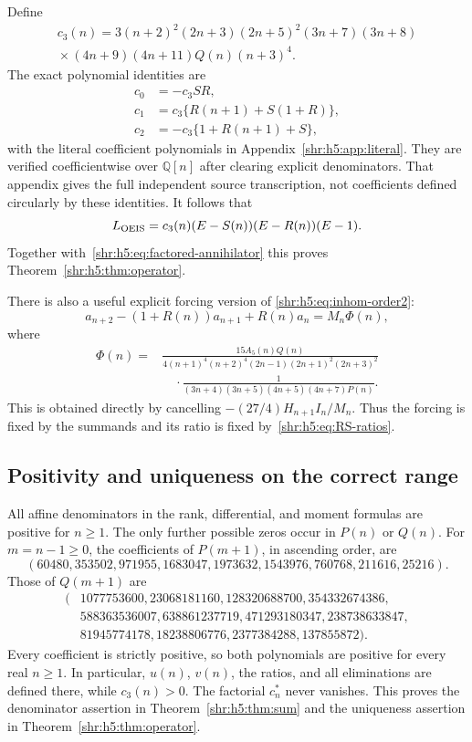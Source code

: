 \documentclass[11pt,letterpaper]{article}
\numberwithin{equation}{section}
\theoremstyle{definition}
\newcommand{\Q}{\mathbb Q}
\newcommand{\1}{\mathbf 1}
\begin{document}
Define
\begin{multline}
 c_3(n)=3(n+2)^2(2n+3)(2n+5)^2(3n+7)(3n+8)\\
 {}\times(4n+9)(4n+11)Q(n)(n+3)^4.
 \label{shr:h5:eq:c3}
\end{multline}
The exact polynomial identities are
\begin{align}
 c_0&=-c_3SR,\\
 c_1&=c_3\{R(n+1)+S(1+R)\},\\
 c_2&=-c_3\{1+R(n+1)+S\},
 \label{shr:h5:eq:literal-identities}
\end{align}
with the literal coefficient polynomials in Appendix~\ref{shr:h5:app:literal}.
They are verified coefficientwise over $\Q[n]$ after clearing
explicit denominators. That appendix gives the full independent source
transcription, not coefficients defined circularly by these identities.
It follows that
\begin{equation}
 L_{\rm OEIS}=c_3(n)(E-S(n))(E-R(n))(E-1).
 \label{shr:h5:eq:operator-factorization}
\end{equation}
Together with~\eqref{shr:h5:eq:factored-annihilator} this proves
Theorem~\ref{shr:h5:thm:operator}.

There is also a useful explicit forcing version of
\eqref{shr:h5:eq:inhom-order2}:
\begin{equation}
 a_{n+2}-(1+R(n))a_{n+1}+R(n)a_n=M_n\Phi(n),
 \label{shr:h5:eq:order2-forcing}
\end{equation}
where
\begin{align}
 \Phi(n)={}&\frac{15A_5(n)Q(n)}
 {4(n+1)^4(n+2)^4(2n-1)(2n+1)^2(2n+3)^2}\\
 &\hspace{1em}\cdot
 \frac1{(3n+4)(3n+5)(4n+5)(4n+7)P(n)}.
 \label{shr:h5:eq:Phi}
\end{align}
This is obtained directly by cancelling
$-(27/4)H_{n+1}I_n/M_n$. Thus the forcing is fixed by the summands
and its ratio is fixed by~\eqref{shr:h5:eq:RS-ratios}.

\subsection{Positivity and uniqueness on the correct range}
All affine denominators in the rank, differential, and moment formulas
are positive for $n\ge1$. The only further possible zeros occur in
$P(n)$ or $Q(n)$. For $m=n-1\ge0$, the coefficients of $P(m+1)$,
in ascending order, are
\[
 (60480,353502,971955,1683047,1973632,1543976,760768,211616,25216).
\]
Those of $Q(m+1)$ are
\begin{align*}
 (&1077753600,23068181160,128320688700,354332674386,\\
  &588363536007,638861237719,471293180347,238738633847,\\
  &81945774178,18238806776,2377384288,137855872).
\end{align*}
Every coefficient is strictly positive, so both polynomials are positive
for every real $n\ge1$. In particular, $u(n)$, $v(n)$, the ratios, and
all eliminations are defined there, while $c_3(n)>0$. The factorial
$c_n^*$ never vanishes. This proves the denominator assertion in
Theorem~\ref{shr:h5:thm:sum} and the uniqueness assertion in
Theorem~\ref{shr:h5:thm:operator}.
\end{document}
